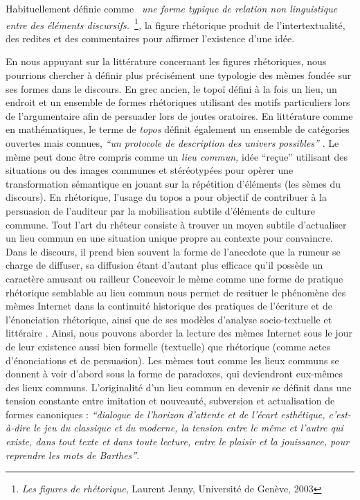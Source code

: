 Habituellement définie comme \textit{{\guillemotleft}~une forme typique de relation non linguistique entre des éléments discursifs.~{\guillemotright}}\footnote{ \textit{Les figures de rhétorique}, Laurent Jenny, Université de Genève, 2003}\textit{, }la figure rhétorique produit de l{\textquoteright}intertextualité, des redites et des commentaires pour affirmer l{\textquoteright}existence d{\textquoteright}une idée.

En nous appuyant sur la littérature concernant les figures rhétoriques, nous pourrions chercher à définir plus précisément une typologie des mèmes fondée sur ses formes dans le discours. En grec ancien, le topo\"i défini à la fois un lieu, un endroit et un ensemble de formes rhétoriques utilisant des motifs particuliers lors de l{\textquoteright}argumentaire afin de persuader lors de joutes oratoires. En littérature comme en mathématiques, le terme de \textit{topos }définit également un ensemble de catégories ouvertes mais connues, \textit{{\textquotedblleft}un protocole de description des univers possibles{\textquotedblright} }\citep{Badiou2006}. Le mème peut donc être compris comme un \textit{lieu commun, }idée {\textquotedblleft}re\c{c}ue{\textquotedblright} utilisant des situations ou des images communes et stéréotypées pour opèrer une transformation sémantique en jouant sur la répétition d'éléments (les sèmes du discours). En rhétorique, l{\textquoteright}usage du topos a pour objectif de contribuer à la persuasion de l{\textquoteright}auditeur par la mobilisation subtile d{\textquoteright}éléments de culture commune. Tout l{\textquoteright}art du rhéteur consiste à trouver un moyen subtile d{\textquoteright}actualiser un lieu commun en une situation unique propre au contexte pour convaincre. Dans le discours, il prend bien souvent la forme de l{\textquoteright}anecdote que la rumeur se charge de diffuser, sa diffusion étant d{\textquoteright}autant plus efficace qu{\textquoteright}il possède un caractère amusant ou railleur \citep{Flaubert1997} Concevoir le mème comme une forme de pratique rhétorique semblable au lieu commun nous permet de resituer le phénomène des mèmes Internet dans la continuité historique des pratiques de l{\textquoteright}écriture et de l{\textquoteright}énonciation rhétorique, ainsi que de ses modèles d{\textquoteright}analyse socio-textuelle et littéraire \citep{Plantin1993}. Ainsi, nous pouvons aborder la lecture des mèmes Internet sous le jour de leur existence aussi bien formelle (textuelle) que rhétorique (comme actes d{\textquoteright}énonciations et de persuasion). Les mèmes tout comme les lieux communs se donnent à voir d{\textquoteright}abord sous la forme de paradoxes, qui deviendront eux-mêmes des lieux communs. L{\textquoteright}originalité d{\textquoteright}un lieu commun en devenir se définit dans une tension constante entre imitation et nouveauté, subversion et actualisation de formes canoniques : \textit{``dialogue de l'horizon d'attente et de l'écart esthétique, c'est-à-dire le jeu du classique et du moderne, la tension entre le même et l'autre qui existe, dans tout texte et dans toute lecture, entre le plaisir et la jouissance, pour reprendre les mots de Barthes''}. \citep{Compagnon1997} 

